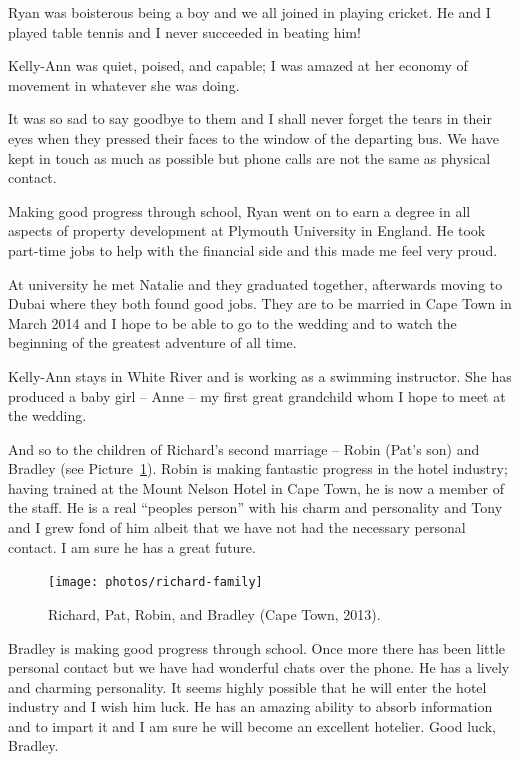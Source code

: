 Ryan was boisterous being a boy and we all joined in playing
cricket. He and I played table tennis and I never succeeded in beating
him!

Kelly-Ann was quiet, poised, and capable; I was amazed at her economy
of movement in whatever she was doing.

It was so sad to say goodbye to them and I shall never forget the
tears in their eyes when they pressed their faces to the window of the
departing bus. We have kept in touch as much as possible but phone
calls are not the same as physical contact.

Making good progress through school, Ryan went on to earn a degree in
all aspects of property development at Plymouth University in
England. He took part-time jobs to help with the financial side and
this made me feel very proud.

At university he met Natalie and they graduated together, afterwards
moving to Dubai where they both found good jobs. They are to be
married in Cape Town in March 2014 and I hope to be able to go to the
wedding and to watch the beginning of the greatest adventure of all
time.

Kelly-Ann stays in White River and is working as a swimming
instructor. She has produced a baby girl -- Anne -- my first great
grandchild whom I hope to meet at the wedding.

And so to the children of Richard's second marriage -- Robin (Pat's
son) and Bradley (see Picture~\ref{richard-family}). Robin is making
fantastic progress in the hotel industry; having trained at the Mount
Nelson Hotel in Cape Town, he is now a member of the staff. He is a
real ``peoples person'' with his charm and personality and Tony and I
grew fond of him albeit that we have not had the necessary personal
contact. I am sure he has a great future.

\begin{figure}
  \centering
  \texttt{[image: photos/richard-family]}
  \caption{Richard, Pat, Robin, and Bradley (Cape Town, 2013).}
  \label{richard-family}
\end{figure}

Bradley is making good progress through school. Once more there has
been little personal contact but we have had wonderful chats over the
phone. He has a lively and charming personality. It seems highly
possible that he will enter the hotel industry and I wish him luck.
He has an amazing ability to absorb information and to impart it and I
am sure he will become an excellent hotelier.  Good luck, Bradley.


